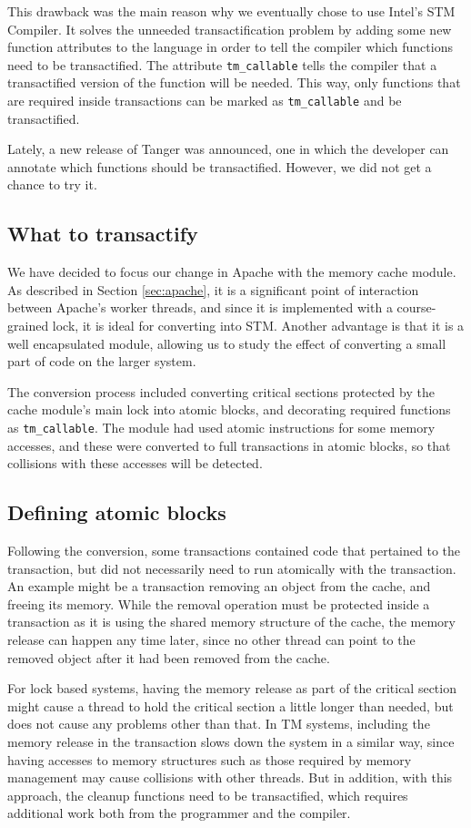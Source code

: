 \documentclass[preprint,11pt]{sigplanconf}
\begin{document}
This drawback was the main reason why we eventually chose to use Intel's STM
Compiler. It solves the unneeded transactification problem by adding some new function attributes
to the language in order to tell the compiler which functions need to be transactified.
The attribute {\tt tm\_callable} tells the compiler that a transactified version
of the function will be needed. This way, only functions that are required inside
transactions can be marked as {\tt tm\_callable} and be transactified.

Lately, a new release of {\sc Tanger} was announced, one in which the developer
can annotate which functions should be transactified. However, we did not get a
chance to try it.

\subsection{What to transactify}
We have decided to focus our change in Apache with the memory cache module. As
described in Section \ref{sec:apache}, it is a significant point of interaction
between Apache's worker threads, and since it is implemented with a course-grained
lock, it is ideal for converting into STM. Another advantage is that it is a
well encapsulated module, allowing us to study the effect of converting a small 
part of code on the larger system.

The conversion process included converting critical sections protected by the
cache module's main lock into atomic blocks, and decorating required functions
as {\tt tm\_callable}. The module had used atomic instructions for some memory
accesses, and these were converted to full transactions in atomic blocks, so
that collisions with these accesses will be detected.

\subsection{Defining atomic blocks}
Following the conversion, some transactions contained code that pertained to
the transaction, but did not necessarily need to run atomically with the
transaction. An example might be a transaction removing an object from the
cache, and freeing its memory. While the removal operation must be protected
inside a transaction as it is using the shared memory structure of the cache,
the memory release can happen any time later, since no other thread can point to
the removed object after it had been removed from the cache. 

For lock based systems, having the memory release as part of the critical
section might cause a thread to hold the critical section a little longer than
needed, but does not cause any problems other than that. In TM
systems, including the memory release in the transaction slows down
the system in a similar way, since
having accesses to memory structures such as those required by
memory management may cause collisions with other threads. But 
in addition, with this approach, the cleanup functions need to be
transactified, which requires additional work both from the programmer and the
compiler.
\end{document}
